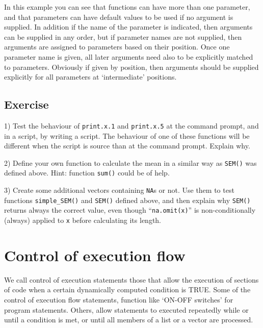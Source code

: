 \documentclass[paper=a4,headsepline,BCOR=12mm,twoside,open=right,%
titlepage,headings=small,fontsize=10pt,index=totoc,bibliography=totoc,%
captions=tableheading,captions=nooneline]{scrbook}\usepackage{knitr}
\begin{document}
In this example you can see that functions can have more than one parameter, and that parameters can have default values to be used if no argument is supplied. In addition if the name of the parameter is indicated, then arguments can be supplied in any order, but if parameter names are not supplied, then arguments are assigned to parameters based on their position. Once one parameter name is given, all later arguments need also to be explicitly matched to parameters. Obviously if given by position, then arguments should be supplied explicitly for all parameters at `intermediate' positions.


\subsection{Exercise}

1) Test the behaviour of \texttt{print.x.1} and \texttt{print.x.5} at the command prompt, and in a script, by writing a script.
The behaviour of one of these functions will be different when the script is source than at the command prompt. Explain why.

2) Define your own function to calculate the mean in a similar way as \texttt{SEM()} was defined above. Hint: function \texttt{sum()} could be of help.

3) Create some additional vectors containing \texttt{NA}s or not. Use them to test functions \texttt{simple\_SEM()} and \texttt{SEM()} defined above, and then explain why \texttt{SEM()} returns always the correct value, even though ``\texttt{na.omit(x)}'' is non-conditionally (always) applied to \texttt{x} before calculating its length.



\section{Control of execution flow}

We call control of execution statements those that allow the execution of sections of code when a certain dynamically computed condition is TRUE. Some of the control of execution flow statements, function like `ON-OFF switches' for program statements. Others, allow statements to executed repeatedly while or until a condition is met, or until all members of a list or a vector are processed.
  
\end{document}
